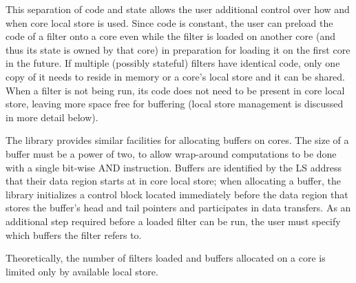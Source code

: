 This separation of code and state allows the user additional control
over how and when core local store is used. Since code is constant,
the user can preload the code of a filter onto a core even while the
filter is loaded on another core (and thus its state is owned by that
core) in preparation for loading it on the first core in the
future. If multiple (possibly stateful) filters have identical code,
only one copy of it needs to reside in memory or a core's local store
and it can be shared. When a filter is not being run, its code does
not need to be present in core local store, leaving more space free
for buffering (local store management is discussed in more detail
below).

The library provides similar facilities for allocating buffers on
cores. The size of a buffer must be a power of two, to allow
wrap-around computations to be done with a single bit-wise \textsf{AND}
instruction. Buffers are identified by the LS address that their data
region starts at in core local store; when allocating a buffer, the
library initializes a control block located immediately before the
data region that stores the buffer's head and tail pointers and
participates in data transfers. As an additional step required before
a loaded filter can be run, the user must specify which buffers the
filter refers to.


Theoretically, the number of filters loaded and buffers allocated on a
core is limited only by available local store.

